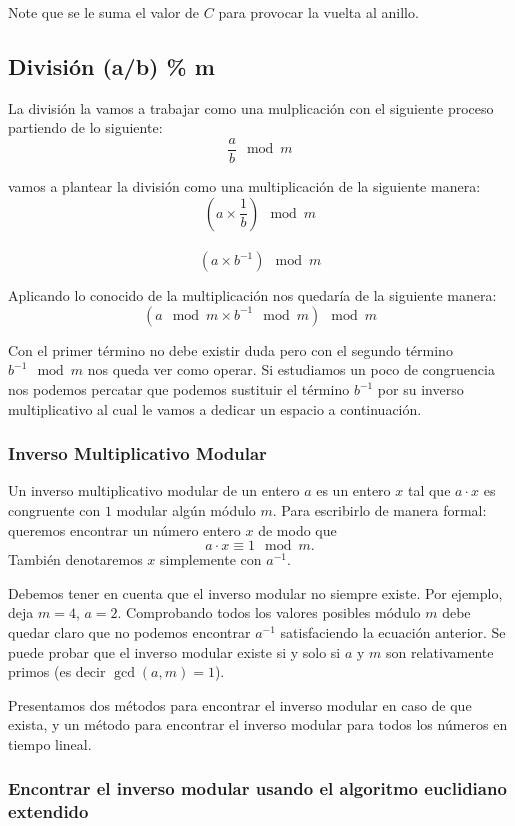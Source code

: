  Note que se le suma el valor de $C$ para provocar la vuelta al anillo.
 
\subsection{División (a/b) \% m}

La división la vamos a trabajar como una mulplicación con el siguiente proceso partiendo de lo siguiente:
\\
$$\frac{a}{b} \mod m$$

vamos a plantear la división como una multiplicación de la siguiente manera:
$$(a \times \frac{1}{b}) \mod m$$\\ 
$$(a \times b^{-1}) \mod m$$

Aplicando lo conocido de la multiplicación nos quedaría de la siguiente manera:
$$(a \mod m \times b^{-1} \mod m ) \mod m$$

Con el primer término no debe existir duda pero con el segundo término $b^{-1} \mod m$ nos queda ver como operar. Si estudiamos un poco de congruencia nos podemos percatar que podemos sustituir el término $b^{-1}$ por su inverso multiplicativo al cual le vamos a dedicar un espacio a continuación.
 
\subsubsection{Inverso Multiplicativo Modular } 
Un inverso multiplicativo modular de un entero $a$ es un entero $x$ tal que  $a\cdot x$ es congruente con $1$ modular algún módulo $m$. Para escribirlo 
de manera formal: queremos encontrar un número entero $x$ de modo que $$a 
\cdot x \equiv 1 \mod m.$$ También denotaremos $x$ simplemente con $a^{-1}$.


Debemos tener en cuenta que el inverso modular no siempre existe. Por ejemplo, deja $m=4$, $a=2$. Comprobando todos los valores posibles 
módulo $m$ debe quedar claro que no podemos encontrar $a^{-1}$ satisfaciendo la ecuación anterior. Se puede probar que el inverso modular 
existe si y solo si $a$ y $m$ son relativamente primos (es decir $\gcd(a, m) = 1$).

Presentamos dos métodos para encontrar el inverso modular en caso de que exista, y un método para encontrar el inverso modular para todos los números en tiempo lineal.

\subsubsection{Encontrar el inverso modular usando el algoritmo euclidiano extendido}

